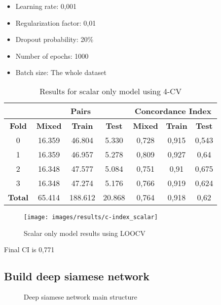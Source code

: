 \begin{frame}
  \begin{itemize}
    \item Learning rate: 0,001
    \item Regularization factor: 0,01
    \item Dropout probability: 20\%
    \item Number of epochs: 1000
    \item Batch size: The whole dataset
  \end{itemize}

  \begin{table}
    \centering
    \begin{tabular}{|c||c|c|c||c|c|c|}
      \cline{2-7}
      \multicolumn{1}{c|}{} & \multicolumn{3}{|c||}{\textbf{Pairs}} & 
      \multicolumn{3}{c|}{\textbf{Concordance Index}} \\
      \hline
      \textbf{Fold} & \textbf{Mixed} & \textbf{Train} & \textbf{Test} & 
      \textbf{Mixed} & \textbf{Train} & \textbf{Test} \\
      \hhline{=======}
      0 & 16.359 & 46.804 & 5.330 & 0,728 & 0,915 & 0,543 \\
      1 & 16.359 & 46.957 & 5.278 & 0,809 & 0,927 & 0,64 \\
      2 & 16.348 & 47.577 & 5.084 & 0,751 & 0,91 & 0,675 \\
      3 & 16.348 & 47.274 & 5.176 & 0,766 & 0,919 & 0,624 \\
      \hhline{=======}
      \textbf{Total} & 65.414 & 188.612 & 20.868 & 0,764 & 0,918 & 0,62   \\
      \hline
    \end{tabular}
  
    \caption[Scalar Only 4-CV results]{
      Results for scalar only model using 4-CV \label{tab:results-scalar-4CV}
    }
  \end{table}
\end{frame}

\begin{frame}
  \begin{figure}
    \centering
    \texttt{[image: images/results/c-index\_scalar]}
    \caption[LOOCV scalar only model results]{
      Scalar only model results using LOOCV \label{fig:results-scalar-LOOCV}
    }
  \end{figure}

  Final CI is 0,771
\end{frame}

\subsection{Build deep siamese network}
\begin{frame}{\insertsubsec}
  \begin{figure}
    \centering
    \scalebox{.7}{}
    \caption[Deep siamese network main structure]{
      Deep siamese network main structure \label{fig:residual-general}
    }
  \end{figure}
\end{frame}

